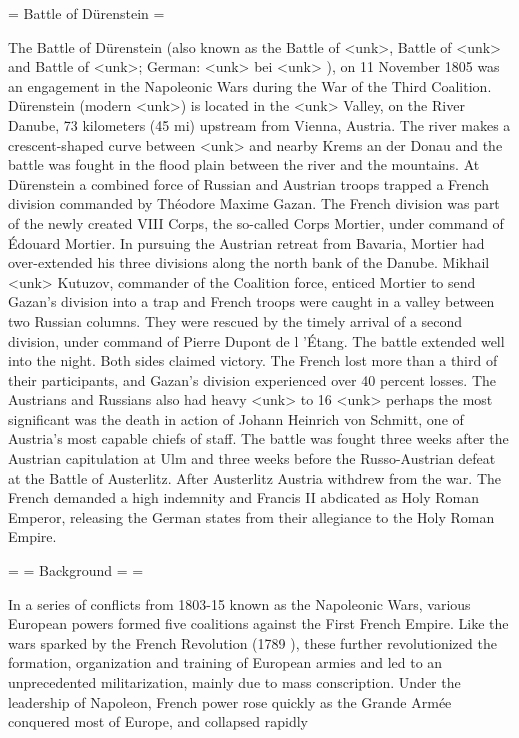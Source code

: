 = Battle of D\"{u}renstein = 

The Battle of D\"{u}renstein (also known as the Battle of <unk>, Battle of <unk> and Battle of <unk>; German: <unk> bei <unk> ), on 11 November 1805 was an engagement in the Napoleonic Wars during the War of the Third Coalition. Dürenstein (modern <unk>) is located in the <unk> Valley, on the River Danube, 73 kilometers (45 mi) upstream from Vienna, Austria. The river makes a crescent-shaped curve between <unk> and nearby Krems an der Donau and the battle was fought in the flood plain between the river and the mountains. 
At Dürenstein a combined force of Russian and Austrian troops trapped a French division commanded by Théodore Maxime Gazan. The French division was part of the newly created VIII Corps, the so-called Corps Mortier, under command of \'{E}douard Mortier. In pursuing the Austrian retreat from Bavaria, Mortier had over-extended his three divisions along the north bank of the Danube. Mikhail <unk> Kutuzov, commander of the Coalition force, enticed Mortier to send Gazan's division into a trap and French troops were caught in a valley between two Russian columns. They were rescued by the timely arrival of a second division, under command of Pierre Dupont de l 'Étang. The battle extended well into the night. Both sides claimed victory. The French lost more than a third of their participants, and Gazan's division experienced over 40 percent losses. The Austrians and Russians also had heavy <unk> to 16 <unk> perhaps the most significant was the death in action of Johann Heinrich von Schmitt, one of Austria's most capable chiefs of staff. 
The battle was fought three weeks after the Austrian capitulation at Ulm and three weeks before the Russo-Austrian defeat at the Battle of Austerlitz. After Austerlitz Austria withdrew from the war. The French demanded a high indemnity and Francis II abdicated as Holy Roman Emperor, releasing the German states from their allegiance to the Holy Roman Empire. 

= = Background = = 

In a series of conflicts from 1803-15 known as the Napoleonic Wars, various European powers formed five coalitions against the First French Empire. Like the wars sparked by the French Revolution (1789 ), these further revolutionized the formation, organization and training of European armies and led to an unprecedented militarization, mainly due to mass conscription. Under the leadership of Napoleon, French power rose quickly as the Grande Armée conquered most of Europe, and collapsed rapidly 
